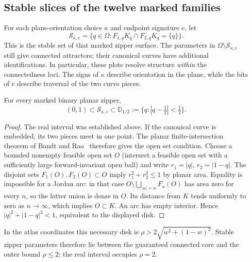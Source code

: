 \subsection{Stable slices of the twelve marked families}
\label{sec:stable-zipper-slices}

For each plane-orientation choice $\kappa$ and endpoint signature $e$, let
\[
 \mathcal S_{\kappa,e}
 =\{q\in\Omega:F_{1,q}K_q\cap F_{2,q}K_q=\{q\}\}.
\]
This is the stable set of that marked zipper surface. The parameters in
$\Omega\setminus\mathcal S_{\kappa,e}$ still give connected attractors;
their canonical curves have additional identifications. In particular,
these plots resolve structure \emph{within} the connectedness loci.
The signs of $\kappa$ describe orientation in the plane, while the bits of
$e$ describe traversal of the two curve pieces.

\begin{proposition}
\label{prop:zipper-necessary-disk}
For every marked binary planar zipper,
\[
 (0,1)\subset\mathcal S_{\kappa,e}
 \subset \mathbb D_{1/2}:=\{q:|q-\tfrac12|<\tfrac12\}.
\]
\end{proposition}
\begin{proof}
The real interval was established above. If the canonical curve is
embedded, its two pieces meet in one point. The planar finite-intersection
theorem of Bandt and Rao~\cite{BandtRao2007} therefore gives the open set
condition. Choose a bounded nonempty feasible open set $O$ (intersect a feasible open
set with a sufficiently large forward-invariant open ball) and write
$r_1=|q|$, $r_2=|1-q|$. The disjoint sets $F_1(O),F_2(O)\subset O$ imply
$r_1^2+r_2^2\le1$ by planar area. Equality is impossible for a Jordan arc:
in that case $O\setminus\bigcup_{|u|=n}F_u(O)$ has area zero for every $n$,
so the latter union is dense in $O$. Its distance from $K$ tends uniformly
to zero as $n\to\infty$, which implies $O\subset K$. An arc has empty
interior. Hence $|q|^2+|1-q|^2<1$, equivalent to the displayed disk.
\end{proof}

In the atlas coordinates this necessary disk is
$\rho>2\sqrt{w^2+(1-w)^2}$. Stable zipper parameters therefore lie between
the guaranteed connected core and the outer bound $\rho\le2$; the real
interval occupies $\rho=2$.

